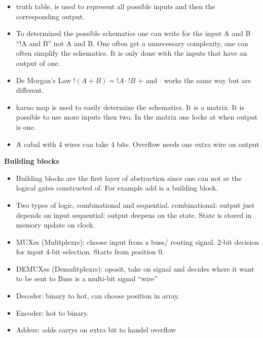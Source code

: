 \begin{itemize}
\item  truth table, is used to represent all possible inputs and then the corresponding output.
\item  To determined the possible schematics one can write for the input A and B ``!A and B''
  not A and B. One often get a unnecessary complexity, one can often simplify the schematics.
  It is only done with the inputs that have an output of one.
\item  De Morgan’s Law $!(A+B)=!A \cdot !B$ $+$ and $\cdot$ works the same way but are different.
\item  karno map is used to easily determine the schematics. It is a matrix. It is possible to use
  more inputs then two. In the matrix one locks at when output is one.
\item  A cabal with 4 wires can take 4 bits. Overflow needs one extra wire on output
\end{itemize}


\textbf{Building blocks}
\begin{itemize}
\item   Building blocks are the first layer of abstraction since one can not se the logical gates
  constructed of. For example add is a building block.
\item  Two types of logic, combinational and sequential.
  combinational: output just depends on input
  sequential: output deepens on the state. State is stored in memory update on clock.
\end{itemize}

\begin{itemize}
\item  MUXes (Mulitplexrs): choose input from a buss/ routing signal.
  2-bit decision for input 4-bit selection. Starts from position 0.
\item  DEMUXes (Demulitplexrs): oposit, take on signal and decides where it want to be sent to
  Buss is a multi-bit signal ``wire''
\item  Decoder: binary to hot, can choose position in array. %
\item  Encoder: hot to binary. %
\item  Adders: adds carrys on extra bit to handel overflow
\end{itemize}

